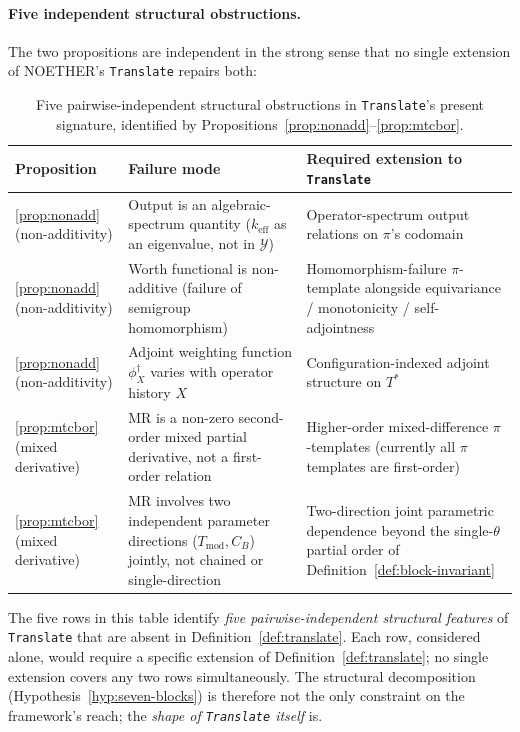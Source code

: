\documentclass[acmsmall,screen,review]{acmart}
\begin{document}
\paragraph{Five independent structural obstructions.}
\label{subsubsec:obstruction set}

The two propositions are independent in the strong sense that no single extension of NOETHER's \texttt{Translate} repairs both:

\begin{table}[h]
\centering
\caption{Five pairwise-independent structural obstructions in \texttt{Translate}'s present signature, identified by Propositions~\ref{prop:nonadd}--\ref{prop:mtcbor}.}
\label{tab:obstruction set}
\footnotesize
\begin{tabular}{p{} p{} p{}}
\toprule
\textbf{Proposition} & \textbf{Failure mode} & \textbf{Required extension to \texttt{Translate}} \\
\midrule
\ref{prop:nonadd} (non-additivity) & Output is an algebraic-spectrum quantity ($k_{\mathrm{eff}}$ as an eigenvalue, not in $\mathcal{Y}$) & Operator-spectrum output relations on $\pi$'s codomain \\
\addlinespace
\ref{prop:nonadd} (non-additivity) & Worth functional is non-additive (failure of semigroup homomorphism) & Homomorphism-failure $\pi$-template alongside equivariance / monotonicity / self-adjointness \\
\addlinespace
\ref{prop:nonadd} (non-additivity) & Adjoint weighting function $\phi^{\dagger}_{X}$ varies with operator history $X$ & Configuration-indexed adjoint structure on $T^{*}$ \\
\addlinespace
\ref{prop:mtcbor} (mixed derivative) & MR is a non-zero second-order mixed partial derivative, not a first-order relation & Higher-order mixed-difference $\pi$-templates (currently all $\pi$ templates are first-order) \\
\addlinespace
\ref{prop:mtcbor} (mixed derivative) & MR involves two independent parameter directions ($T_{\mathrm{mod}}, C_{B}$) jointly, not chained or single-direction & Two-direction joint parametric dependence beyond the single-$\theta$ partial order of Definition~\ref{def:block-invariant} \\
\bottomrule
\end{tabular}
\end{table}

The five rows in this table identify \emph{five pairwise-independent structural features} of \texttt{Translate} that are absent in Definition~\ref{def:translate}. Each row, considered alone, would require a specific extension of Definition~\ref{def:translate}; no single extension covers any two rows simultaneously. The structural decomposition (Hypothesis~\ref{hyp:seven-blocks}) is therefore not the only constraint on the framework's reach; the \emph{shape of \texttt{Translate} itself} is.
\end{document}
